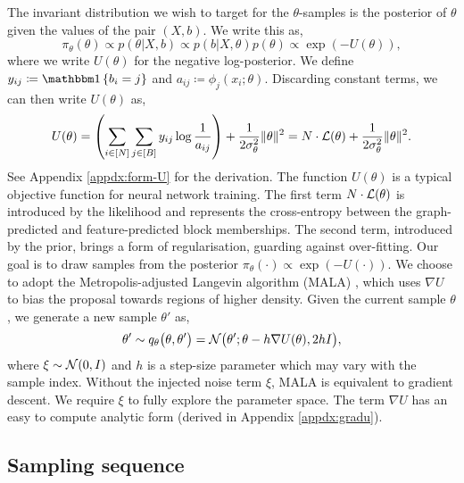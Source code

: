 The invariant distribution we wish to target for the $\theta$-samples is the posterior of $\theta$ given the values of the pair $(X, b)$. 
We write this as,
%
\begin{equation}
	\pi_\theta(\theta) \propto p(\theta | X, b) \propto p(b | X, \theta) p(\theta) \propto  \exp \left( - U(\theta) \right),
	\label{eq:U}
\end{equation}
%
where we write $U(\theta)$ for the negative log-posterior. We define $y_{ij} \coloneqq \one \left\{ b_i = j \right\}$ and $a_{ij} \coloneqq \phi_j(x_i; \theta)$. 
Discarding constant terms, we can then write $U(\theta)$ as,
%
\begin{equation}
	U(\theta) = \left( \sum_{i \in [N]} \sum_{j \in [B]} y_{ij} \log \frac{1}{a_{ij}} \right)
	+ \frac{1}{2\sigma_\theta^2} \|\theta\|^2 = N \cdot \mathcal{L}(\theta) + \frac{1}{2\sigma_\theta^2} \|\theta\|^2.
	\label{eqn:U-form}
\end{equation}
%
See Appendix \ref{appdx:form-U} for the derivation. The function $U(\theta)$ is a typical objective function for neural network training. The first term $N \cdot \mathcal{L}(\theta)$ is introduced by the likelihood and represents the cross-entropy between the graph-predicted and feature-predicted block memberships. 
The second term, introduced by the prior, brings a form of regularisation, guarding against over-fitting. Our goal is to draw samples from the posterior $\pi_\theta(\cdot) \propto \exp(-U(\cdot))$. We choose to adopt the Metropolis-adjusted Langevin algorithm (MALA) \cite{mala-tweedie}, which uses $\nabla U$ to bias the proposal towards regions of higher density. Given the current sample $\theta$, we generate 
a new sample $\theta'$ as,
%
\begin{equation*}
	\theta' \sim q_\theta\big(\theta, \theta'\big) 
	= \mathcal{N} \big( \theta' ; \theta - h \nabla U(\theta), 2h I \big),
\end{equation*}
%
where $\xi \sim \mathcal{N}(0, I)$ and $h$ is a step-size parameter 
which may vary with the sample index.
Without the injected noise term $\xi$, MALA is equivalent to gradient descent. We require $\xi$ to fully explore the parameter space. 
The term $\nabla U$ has an easy to compute analytic form (derived in Appendix \ref{appdx:gradu}).

\subsection{Sampling sequence}
\label{s:ss}

